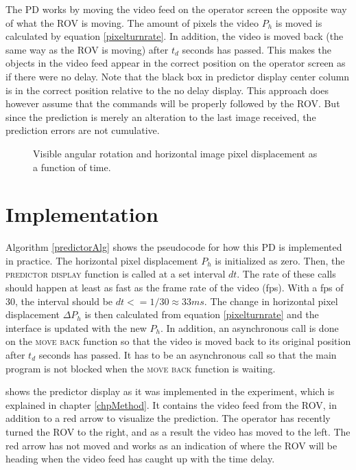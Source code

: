 The PD works by moving the video feed on the operator screen the opposite way of what the ROV is moving. The amount of pixels the video $P_h$ is moved is calculated by equation \ref{pixelturnrate}. In addition, the video is moved back (the same way as the ROV is moving) after $t_d$ seconds has passed. This makes the objects in the video feed appear in the correct position on the operator screen as if there were no delay. Note that the black box in  predictor display center column is in the correct position relative to the no delay display. This approach does however assume that the commands will be properly followed by the ROV. But since the prediction is merely an alteration to the last image received, the prediction errors are not cumulative.


\begin{figure}[h!]    
    \centering           
    \def\svgwidth{\columnwidth}
    
    \caption{Visible angular rotation and horizontal image pixel displacement as a function of time.}
    \label{timePlot}
\end{figure}

\vspace{-3mm}
\section{Implementation}

Algorithm \ref{predictorAlg} shows the pseudocode for how this PD is implemented in practice. The horizontal pixel displacement $P_h$ is initialized as zero. Then, the \textsc{predictor display} function is called at a set interval $dt$. The rate of these calls should happen at least as fast as the frame rate of the video (fps). With a fps of 30, the interval should be $dt <= 1/30 \approx 33 ms$. The change in horizontal pixel displacement $\Delta P_h$ is then calculated from equation \ref{pixelturnrate} and the interface is updated with the new $P_h$. In addition, an asynchronous call is done on the \textsc{move back} function so that the video is moved back to its original position after $t_d$ seconds has passed. It has to be an asynchronous call so that the main program is not blocked when the \textsc{move back} function is waiting.



 shows the predictor display as it was implemented in the experiment, which is explained in chapter \ref{chpMethod}. It contains the video feed from the ROV, in addition to a red arrow to visualize the prediction. The operator has recently turned the ROV to the right, and as a result the video has moved to the left. The red arrow has not moved and works as an indication of where the ROV will be heading when the video feed has caught up with the time delay.

